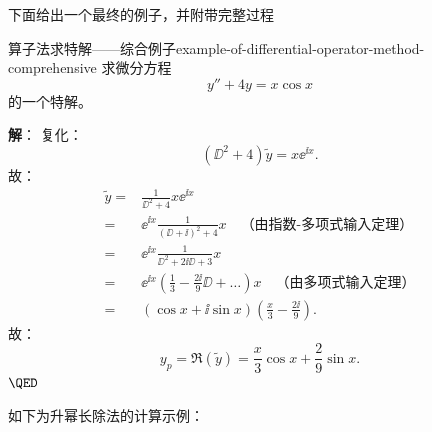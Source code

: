 下面给出一个最终的例子，并附带完整过程
\begin{example}{算子法求特解——综合例子}{example-of-differential-operator-method-comprehensive}
    求微分方程
    \begin{equation*}
        y'' + 4 y = x \cos x
    \end{equation*}
    的一个特解。

    \textbf{解}：
    复化：
    \begin{equation*}
        (\DD^2 + 4) \tilde{y} = x \ee^{\ii x} .
    \end{equation*}
    故：
    \begin{equation*}
        \begin{aligned}
            \tilde{y} = & \frac{1}{\DD^2 + 4} x \ee^{\ii x}                                                              \\
            =           & \ee^{\ii x} \frac{1}{(\DD + \ii)^2 + 4} x \quad \text{（由指数-多项式输入定理）}                           \\
            =           & \ee^{\ii x} \frac{1}{\DD^2 + 2\ii \DD + 3} x                                                   \\
            =           & \ee^{\ii x} \left( \frac{1}{3} - \frac{2\ii}{9} \DD + \ldots \right) x \quad \text{（由多项式输入定理）} \\
            =           & (\cos x + \ii \sin x) \left( \frac{x}{3} - \frac{2\ii}{9} \right) .
        \end{aligned}
    \end{equation*}
    故：
    \begin{equation*}
        y_p = \Re (\tilde{y}) = \frac{x}{3} \cos x + \frac{2}{9} \sin x .
    \end{equation*}
    $\hfill \QED $
    \bigskip

    如下为升幂长除法的计算示例：
    {
    \newcommand{\longdiv}{
        \smash{\mkern-0.43mu\vstretch{1.34}
            {\hstretch{0.9}{)}}\mkern-5.95mu\vstretch{1.34}{\hstretch{0.85}{)}}}
    }

}
\end{example}
